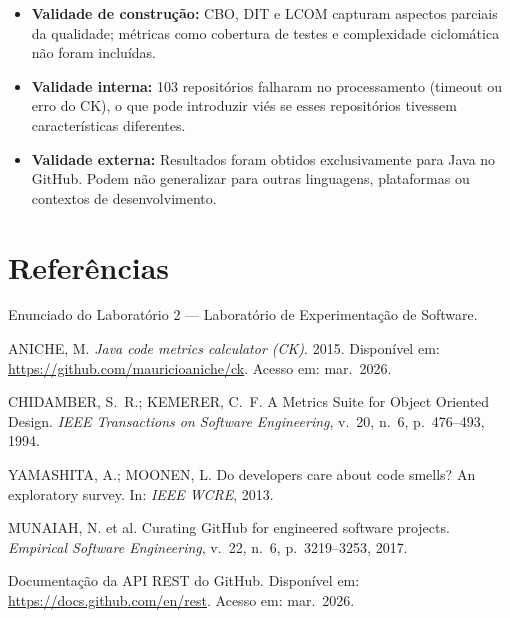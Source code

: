 \documentclass[12pt,a4paper]{article}
\begin{document}
\begin{itemize}
    \item \textbf{Validade de construção:} CBO, DIT e LCOM capturam aspectos parciais da qualidade; métricas como cobertura de testes e complexidade ciclomática não foram incluídas.
    \item \textbf{Validade interna:} 103 repositórios falharam no processamento (timeout ou erro do CK), o que pode introduzir viés se esses repositórios tivessem características diferentes.
    \item \textbf{Validade externa:} Resultados foram obtidos exclusivamente para Java no GitHub. Podem não generalizar para outras linguagens, plataformas ou contextos de desenvolvimento.
\end{itemize}

\newpage

\section{Referências}

\begin{enumerate}[label={[\arabic*]}]
    \item Enunciado do Laboratório 2 — Laboratório de Experimentação de Software.
    \item ANICHE, M. \textit{Java code metrics calculator (CK)}. 2015. Disponível em: \url{https://github.com/mauricioaniche/ck}. Acesso em: mar.\ 2026.
    \item CHIDAMBER, S.~R.; KEMERER, C.~F. A Metrics Suite for Object Oriented Design. \textit{IEEE Transactions on Software Engineering}, v.~20, n.~6, p.~476--493, 1994.
    \item YAMASHITA, A.; MOONEN, L. Do developers care about code smells? An exploratory survey. In: \textit{IEEE WCRE}, 2013.
    \item MUNAIAH, N. et al. Curating GitHub for engineered software projects. \textit{Empirical Software Engineering}, v.~22, n.~6, p.~3219--3253, 2017.
    \item Documentação da API REST do GitHub. Disponível em: \url{https://docs.github.com/en/rest}. Acesso em: mar.\ 2026.
\end{enumerate}
\end{document}
